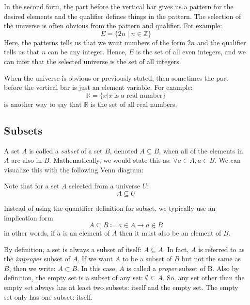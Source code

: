 \documentclass[letterpaper,12pt,fleqn]{article}
\begin{document}
In the second form, the part before the vertical bar gives us a pattern for the
desired elements and the qualifier defines things in the pattern. The selection
of the universe is often obvious from the pattern and qualifier. For example:
\[E=\{2n\mid n\in\mathbb{Z}\}\]
Here, the patterns tells us that we want numbers of the form $2n$ and the
qualifier tells us that $n$ can be any integer. Hence, $E$ is the set of all
even integers, and we can infer that the selected universe is the set of all
integers.

When the universe is obvious or previously stated, then sometimes the part
before the vertical bar is just an element variable.  For example:
\[\mathbb{R}=\{x|x\ \mbox{is a real number}\}\]
is another way to say that $\mathbb{R}$ is the set of all real numbers.

\subsection*{Subsets}

A set $A$ is called a \emph{subset} of a set $B$, denoted $A\subseteq B$, when
all of the elements in $A$ are also in $B$.  Mathematically, we would state
this as: $\forall a\in A, a\in B$. We can visualize this with the following
Venn diagram:

\begin{center}
\end{center}

Note that for a set $A$ selected from a universe $U$:
\[A\subseteq U\]

Instead of using the quantifier definition for subset, we typically use an
implication form:
\[A\subseteq B\coloneqq a\in A\rightarrow a\in B\]
in other words, if $a$ is an element of $A$ then it must also be an element of
$B$.

By definition, a set is always a subset of itself: $A\subseteq A$. In fact, $A$
is referred to as the \emph{improper} subset of $A$. If we want $A$ to be a
subset of $B$ but not the same as $B$, then we write: $A\subset B$. In this
case, $A$ is called a \emph{proper} subset of B. Also by definition, the
empty set is a subset of any set: $\emptyset\subseteq A$. So, any set other
than the empty set always has at least two subsets: itself and the empty set.
The empty set only has one subset: itself.
\end{document}
